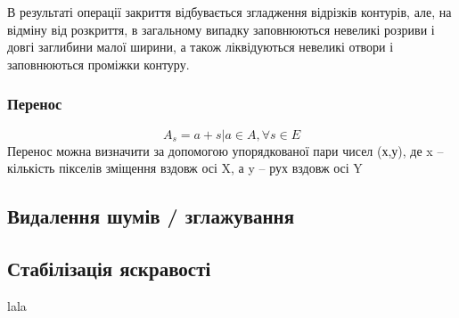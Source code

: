 	
	В результаті операції закриття відбувається згладження відрізків контурів, але, на відміну від розкриття, в загальному випадку заповнюються невеликі розриви і довгі заглибини малої ширини, а також ліквідуються невеликі отвори і заповнюються проміжки контуру.
	
\subsubsection{Перенос}
	\begin{equation}
	A_{s} = { a + s | a \in A}, \forall s \in E
	\end{equation}
	Перенос можна визначити за допомогою упорядкованої пари чисел (х,у), де x – кількість пікселів зміщення вздовж осі X, а y – рух вздовж осі Y


\subsection{Видалення шумів / зглажування}


\subsection{Стабілізація яскравості}
lala